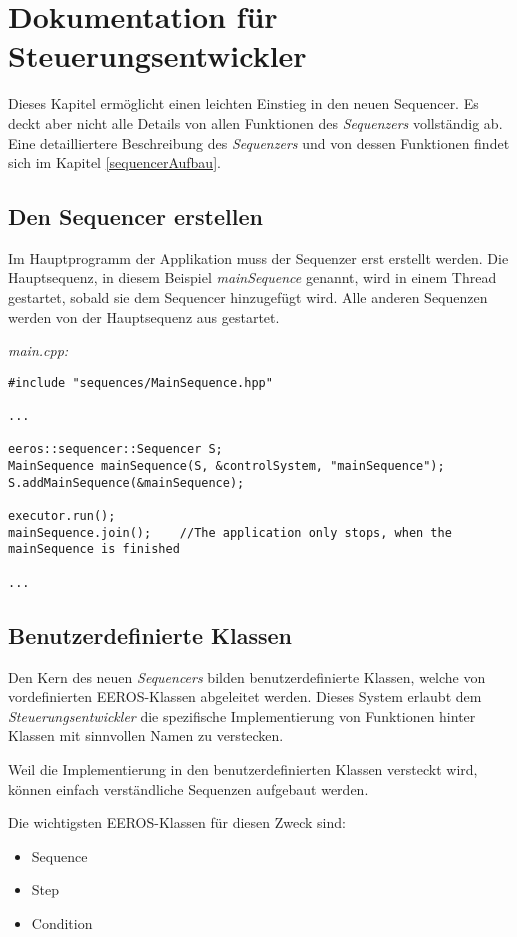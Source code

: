 \chapter{Dokumentation für Steuerungsentwickler}
Dieses Kapitel ermöglicht einen leichten Einstieg in den neuen Sequencer.
Es deckt aber nicht alle Details von allen Funktionen des \textit{Sequenzers} vollständig ab.
Eine detailliertere Beschreibung des \textit{Sequenzers} und von dessen Funktionen findet sich im Kapitel \ref{sequencerAufbau}.


\section{Den Sequencer erstellen}
Im Hauptprogramm der Applikation muss der Sequenzer erst erstellt werden.
Die Hauptsequenz, in diesem Beispiel \textit{mainSequence} genannt, wird in einem Thread gestartet, sobald sie dem Sequencer hinzugefügt wird.
Alle anderen Sequenzen werden von der Hauptsequenz aus gestartet.

\textit{main.cpp:}\
\begin{lstlisting}
#include "sequences/MainSequence.hpp"

...

eeros::sequencer::Sequencer S;
MainSequence mainSequence(S, &controlSystem, "mainSequence");
S.addMainSequence(&mainSequence);

executor.run();
mainSequence.join();	//The application only stops, when the mainSequence is finished

...
\end{lstlisting}


\section{Benutzerdefinierte Klassen}
Den Kern des neuen \textit{Sequencers} bilden benutzerdefinierte Klassen, welche von vordefinierten EEROS-Klassen abgeleitet werden.
Dieses System erlaubt dem \textit{Steuerungsentwickler} die spezifische Implementierung von Funktionen hinter Klassen mit sinnvollen Namen zu verstecken.

Weil die Implementierung in den benutzerdefinierten Klassen versteckt wird, können einfach verständliche Sequenzen aufgebaut werden.

Die wichtigsten EEROS-Klassen für diesen Zweck sind:
\begin{itemize}
\item Sequence
\item Step
\item Condition
\end{itemize}

